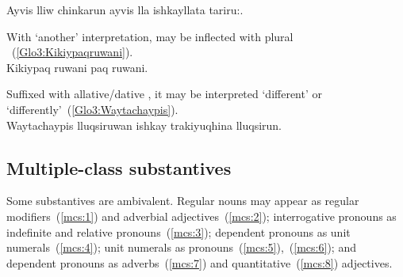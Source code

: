 %
{Ayvis lliw chinkarun ayvis lla ishkayllata tariru:.}%
{}%
{}{}%

\noindent
With ‘another’ interpretation,  may be inflected with plural ~(\ref{Glo3:Kikiypaqruwani}).\\

%
{Kikiypaq ruwani paq ruwani.}%
{}%
{}{}%

\noindent
Suffixed with allative/dative , it may be interpreted ‘different’ or ‘differently’~(\ref{Glo3:Waytachaypis}).\\

%
{Waytachaypis  lluqsiruwan ishkay trakiyuqhina lluqsirun.}%
{}%
{}{}%

\subsection{Multiple-class substantives}\label{sec:mcsub}
Some substantives are ambivalent. Regular nouns may appear as regular modifiers~(\ref{mcs:1}) and adverbial adjectives~(\ref{mcs:2}); interrogative pronouns as indefinite and relative pronouns~(\ref{mcs:3}); dependent pronouns as unit numerals~(\ref{mcs:4}); unit numerals as pronouns~(\ref{mcs:5}),~(\ref{mcs:6}); and dependent pronouns as adverbs~(\ref{mcs:7}) and quantitative~(\ref{mcs:8}) adjectives.

